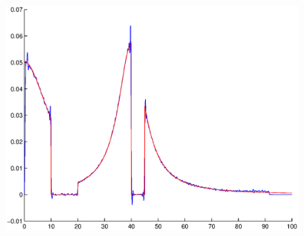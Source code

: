 \documentclass[A4paper,11pt]{article}
\theoremstyle{definition}
\begin{document}
\begin{figure}[H]
\begin{minipage}{.33\textwidth}
  \vspace{0.2cm}
  \includegraphics[scale=0.25]{pictures/Example9/Fig7.eps}
  \label{fig:9_7}
\end{minipage}%
\caption{}
\label{fig:9}
\end{figure}
\end{document}

